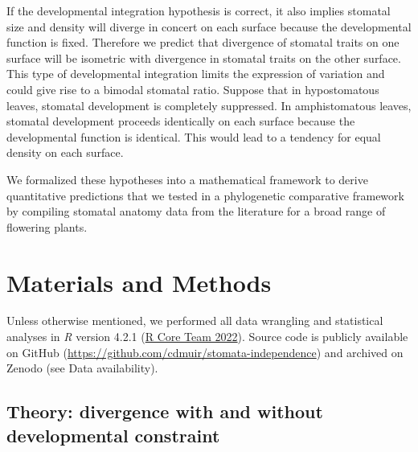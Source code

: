 \documentclass[
  12pt,
]{article}
\begin{document}

If the developmental integration hypothesis is correct, it also implies stomatal size and density will diverge in concert on each surface because the developmental function is fixed. Therefore we predict that divergence of stomatal traits on one surface will be isometric with divergence in stomatal traits on the other surface. This type of developmental integration limits the expression of variation and could give rise to a bimodal stomatal ratio. Suppose that in hypostomatous leaves, stomatal development is completely suppressed. In amphistomatous leaves, stomatal development proceeds identically on each surface because the developmental function is identical. This would lead to a tendency for equal density on each surface.

We formalized these hypotheses into a mathematical framework to derive quantitative predictions that we tested in a phylogenetic comparative framework by compiling stomatal anatomy data from the literature for a broad range of flowering plants.

\hypertarget{materials-and-methods}{%
\section{Materials and Methods}\label{materials-and-methods}}

Unless otherwise mentioned, we performed all data wrangling and statistical analyses in \emph{R} version 4.2.1 (\protect\hyperlink{ref-r_core_team_r:_2022}{R Core Team 2022}). Source code is publicly available on GitHub (\url{https://github.com/cdmuir/stomata-independence}) and archived on Zenodo (see Data availability).

\hypertarget{theory-divergence-with-and-without-developmental-constraint}{%
\subsection{Theory: divergence with and without developmental constraint}\label{theory-divergence-with-and-without-developmental-constraint}}
\end{document}
